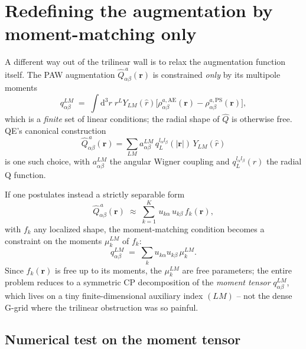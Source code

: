 \documentclass[aps,prb,reprint,superscriptaddress,nofootinbib]{revtex4-2}
\newcommand{\dd}{\mathrm d}
\begin{document}
\section{Redefining the augmentation by moment-matching only}
\label{sec:moment-matching}

A different way out of the trilinear wall is to relax the augmentation
function itself.  The PAW augmentation
\(\widehat Q^{\,a}_{\alpha\beta}(\mathbf r)\) is constrained
\emph{only} by its multipole moments
\begin{equation}
q^{LM}_{\alpha\beta}
\;=\;\int\!\dd^3 r\; r^L Y_{LM}(\hat r)
\bigl[\rho^{a,\mathrm{AE}}_{\alpha\beta}(\mathbf r)
-\rho^{a,\mathrm{PS}}_{\alpha\beta}(\mathbf r)\bigr],
\label{eq:moments}
\end{equation}
which is a \emph{finite} set of linear conditions; the radial shape of
\(\widehat Q\) is otherwise free.  QE's canonical construction
\begin{equation}
\widehat Q^{\,a}_{\alpha\beta}(\mathbf r)
=\sum_{LM}a^{LM}_{\alpha\beta}\,
q^{l_\alpha l_\beta}_L(|\mathbf r|)\,Y_{LM}(\hat r)
\label{eq:QE-aug}
\end{equation}
is one such choice, with \(a^{LM}_{\alpha\beta}\) the angular Wigner
coupling and \(q^{l_\alpha l_\beta}_L(r)\) the radial Q function.

If one postulates instead a strictly separable form
\begin{equation}
\widehat Q^{\,a}_{\alpha\beta}(\mathbf r)
\;\approx\;\sum_{k=1}^{K}\,
u_{k\alpha}\,u_{k\beta}\,f_k(\mathbf r),
\label{eq:aug-CP}
\end{equation}
with \(f_k\) any localized shape, the moment-matching condition
becomes a constraint on the moments \(\mu_k^{LM}\) of \(f_k\):
\begin{equation}
q^{LM}_{\alpha\beta}
\;=\;\sum_k u_{k\alpha}u_{k\beta}\,\mu_k^{LM}.
\label{eq:moment-match-CP}
\end{equation}
Since \(f_k(\mathbf r)\) is free up to its moments, the
\(\mu_k^{LM}\) are free parameters; the entire problem reduces to a
symmetric CP decomposition of the \emph{moment tensor}
\(q^{LM}_{\alpha\beta}\), which lives on a tiny finite-dimensional
auxiliary index \((LM)\) -- not the dense G-grid where the trilinear
obstruction was so painful.

\subsection{Numerical test on the moment tensor}
\end{document}
